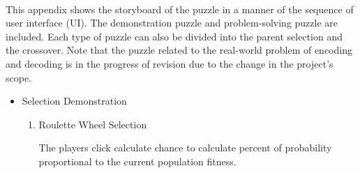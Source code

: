 \documentclass[12pt,oneside,openright,a4paper]{cpe-english-project}
\begin{document}
  \\
\label{appendix:puzzle-storyboard}
This appendix shows the storyboard of the puzzle in a manner of the sequence of user interface (UI). The demonstration puzzle and problem-solving puzzle are included. Each type of puzzle can also be divided into the parent selection and the crossover. Note that the puzzle related to the real-world problem of encoding and decoding is in the progress of revision due to the change in the project's scope.

\begin{itemize}
	\item Selection Demonstration \\
	\begin{enumerate}
		\item Roulette Wheel Selection \\
		\begin{minipage}[c]{\textwidth}\centering {}  \end{minipage}
		The players click calculate chance to calculate percent of probability proportional to the current population fitness. \\
		\begin{minipage}[c]{\textwidth}\centering {}  \end{minipage}

\end{enumerate}
\end{itemize}
\end{document}
